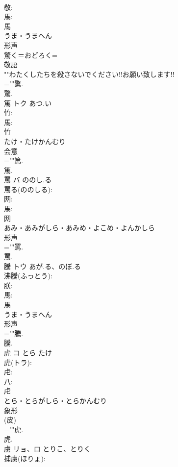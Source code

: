 \documentclass[8pt]{extreport}
\begin{document}
\begin{CJK}{UTF8}{min}
\\	敬: 
\\	馬: 
\\	馬	
\\	うま・うまへん	
\\	形声 
\\	驚く＝おどろく= 
\\	敬語 
\\	""わたくしたちを殺さないでください!!お願い致します!!
\\	=""驚.
\\	驚.
\\	篤	トク	あつ.い		
\\	竹: 
\\	馬: 
\\	竹	
\\	たけ・たけかんむり	
\\	会意 
\\	=""篤.
\\	篤.
\\	罵	バ	ののし.る		
\\	罵る(ののしる): 
\\	网: 
\\	馬: 
\\	网	
\\	あみ・あみがしら・あみめ・よこめ・よんかしら	
\\	形声 
\\	=""罵.
\\	罵.
\\	騰	トウ	あが.る、のぼ.る		
\\	沸騰(ふっとう): 
\\	朕: 
\\	馬: 
\\	馬	
\\	うま・うまへん	
\\	形声 
\\	=""騰.
\\	騰.
\\	虎	コ	とら	たけ	
\\	虎(トラ): 
\\	虍: 
\\	八: 
\\	虍	
\\	とら・とらがしら・とらかんむり	
\\	象形 
\\	(皮) 
\\	=""虎.
\\	虎.
\\	虜	リョ、ロ	とりこ、とりく		
\\	捕虜(ほりょ): 

\end{CJK}
\end{document}
